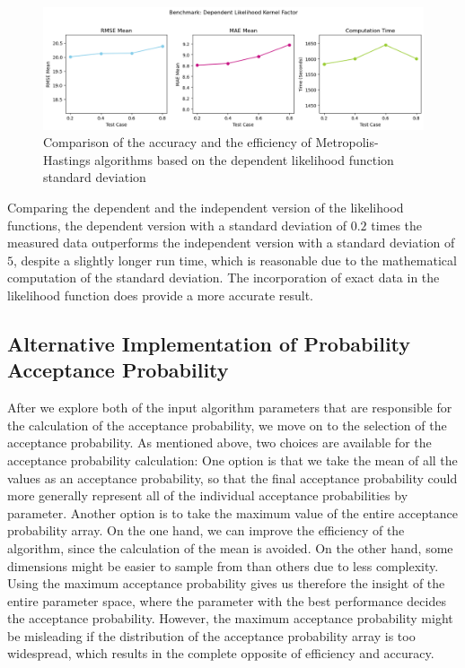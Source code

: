 \begin{figure}[H]
    \centering
    \includegraphics[width=1\textwidth]{figures/basic_mh/benchmark/sensitivity_likelihood_dependent.png}
    \captionsetup{width=.8\textwidth}
    \caption{Comparison of the accuracy and the efficiency of Metropolis-Hastings algorithms based on the dependent likelihood function standard deviation}
    \label{fig:enter-label}
\end{figure}


Comparing the dependent and the independent version of the likelihood functions, the dependent version with a standard deviation of $0.2$ times the measured data outperforms the independent version with a standard deviation of $5$, despite a slightly longer run time, which is reasonable due to the mathematical computation of the standard deviation. The incorporation of exact data in the likelihood function does provide a more accurate result.

\subsection{Alternative Implementation of Probability Acceptance Probability}
After we explore both of the input algorithm parameters that are responsible for the calculation of the acceptance probability, we move on to the selection of the acceptance probability. As mentioned above, two choices are available for the acceptance probability calculation: One option is that we take the mean of all the values as an acceptance probability, so that the final acceptance probability could more generally represent all of the individual acceptance probabilities by parameter. Another option is to take the maximum value of the entire acceptance probability array. On the one hand, we can improve the efficiency of the algorithm, since the calculation of the mean is avoided. On the other hand, some dimensions might be easier to sample from than others due to less complexity. Using the maximum acceptance probability gives us therefore the insight of the entire parameter space, where the parameter with the best performance decides the acceptance probability. However, the maximum acceptance probability might be misleading if the distribution of the acceptance probability array is too widespread, which results in the complete opposite of efficiency and accuracy.

